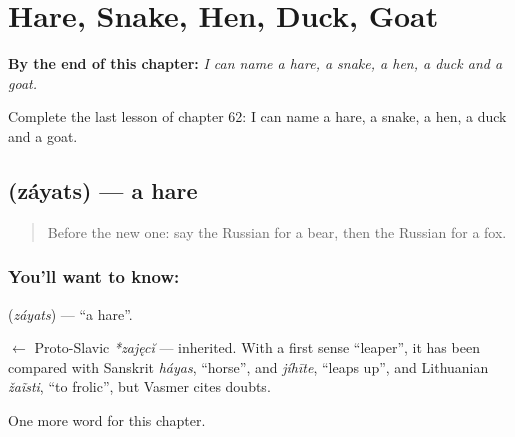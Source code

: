 
\chapter{Hare, Snake, Hen, Duck, Goat}
\label{ch:ru-hare-snake-hen-duck-goat}

\begin{chapteropening}
\textbf{By the end of this chapter:} \emph{I can name a hare, a snake, a hen, a duck and a goat.}

Complete the last lesson of chapter 62: I can name a hare, a snake, a hen, a duck and a goat.
\end{chapteropening}

\section[\texorpdfstring{\ru{заяц} (záyats)}{заяц (záyats)}]{ (záyats) — a hare}

\label{lesson:RU-C62-hare}



\begin{quote}
Before the new one: say the Russian for a bear, then the Russian for a fox.
\end{quote}

\subsection*{You'll want to know: }
\textbf{} (\emph{záyats}) — \textquotedblleft{}a hare\textquotedblright{}.

\begin{cousinweb}
\textbf{} $\leftarrow$ Proto-Slavic \emph{*zajęcĭ} — inherited. With a first sense \textquotedblleft{}leaper\textquotedblright{}, it has been compared with Sanskrit \emph{háyas}, \textquotedblleft{}horse\textquotedblright{}, and \emph{jíhīte}, \textquotedblleft{}leaps up\textquotedblright{}, and Lithuanian \emph{žaĩsti}, \textquotedblleft{}to frolic\textquotedblright{}, but Vasmer cites doubts.
\end{cousinweb}

\begin{grammarlens}[title={What you've built}]
One more word for this chapter.
\end{grammarlens}

